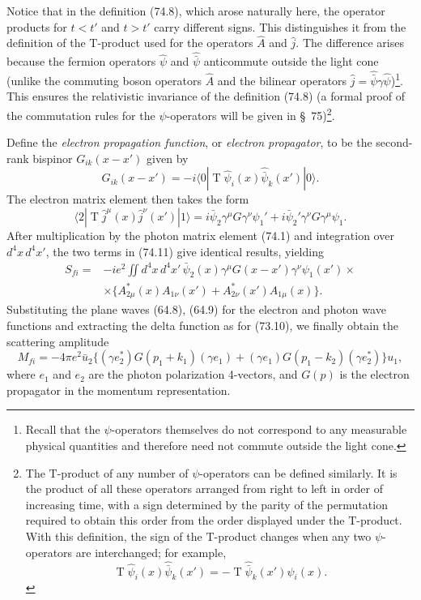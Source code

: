 Notice that in the definition (74.8), which arose naturally here, the operator products for $t<t'$ and $t>t'$ carry different signs. This distinguishes it from the definition of the $\mathrm T$-product used for the operators $\hat A$ and $\hat j$. The difference arises because the fermion operators $\hat\psi$ and $\widehat{\bar\psi}$ anticommute outside the light cone (unlike the commuting boson operators $\hat A$ and the bilinear operators $\hat j=\widehat{\bar\psi}\gamma\hat\psi$)\footnote{Recall that the $\psi$-operators themselves do not correspond to any measurable physical quantities and therefore need not commute outside the light cone.}. This ensures the relativistic invariance of the definition (74.8) (a formal proof of the commutation rules for the $\psi$-operators will be given in \S~75)\footnote{The $\mathrm T$-product of any number of $\psi$-operators can be defined similarly. It is the product of all these operators arranged from right to left in order of increasing time, with a sign determined by the parity of the permutation required to obtain this order from the order displayed under the $\mathrm T$-product. With this definition, the sign of the $\mathrm T$-product changes when any two $\psi$-operators are interchanged; for example,
\[
\mathop{\mathrm T}\hat\psi_i(x)\widehat{\bar\psi}_k(x')
=-\mathop{\mathrm T}\widehat{\bar\psi}_k(x')\hat\psi_i(x).
\] }.

Define the \emph{electron propagation function}, or \emph{electron propagator}, to be the second-rank bispinor $G_{ik}(x-x')$ given by
\begin{equation}
G_{ik}(x-x')=-i\langle0|\mathop{\mathrm T}\hat\psi_i(x)\widehat{\bar\psi}_k(x')|0\rangle.
\tag{74.10}
\end{equation}
The electron matrix element then takes the form
\begin{equation}
\langle2|\mathop{\mathrm T}\hat j^\mu(x)\hat j^\nu(x')|1\rangle
=i\bar\psi_2\gamma^\mu G\gamma^\nu\psi_1'
+i\bar\psi_2'\gamma^\nu G\gamma^\mu\psi_1.
\tag{74.11}
\end{equation}
After multiplication by the photon matrix element (74.1) and integration over $d^4x\,d^4x'$, the two terms in (74.11) give identical results, yielding
\begin{equation}
\begin{aligned}
S_{fi}={}&-ie^2\iint d^4x\,d^4x'\,
\bar\psi_2(x)\gamma^\mu G(x-x')\gamma^\nu\psi_1(x')\times\\
&\times\bigl\{A_{2\mu}^*(x)A_{1\nu}(x')+A_{2\nu}^*(x')A_{1\mu}(x)\bigr\}.
\end{aligned}
\tag{74.12}
\end{equation}
Substituting the plane waves (64.8), (64.9) for the electron and photon wave functions and extracting the delta function as for (73.10), we finally obtain the scattering amplitude
\begin{equation}
M_{fi}=-4\pi e^2\bar u_2\bigl\{(\gamma e_2^*)G(p_1+k_1)(\gamma e_1)
+(\gamma e_1)G(p_1-k_2)(\gamma e_2^*)\bigr\}u_1,
\tag{74.13}
\end{equation}
where $e_1$ and $e_2$ are the photon polarization 4-vectors, and $G(p)$ is the electron propagator in the momentum representation.

